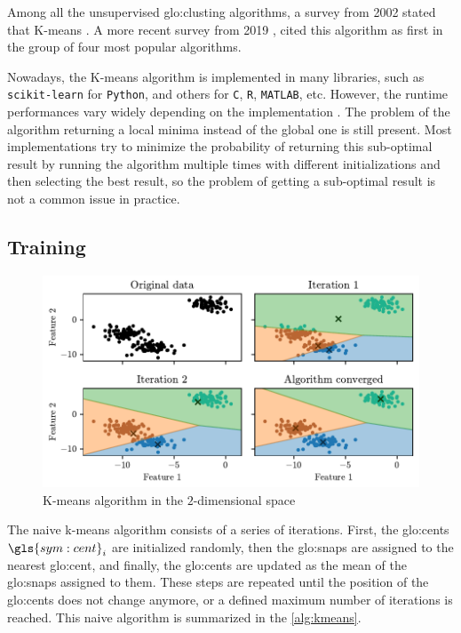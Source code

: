 Among all the unsupervised \gls{glo:clust}ing algorithms, a survey from 2002 \cite{berkhin2002survey} stated that K-means . A more recent survey from 2019 \cite{Abla2019survey}, cited this algorithm as first in the group of four most popular algorithms.

Nowadays, the K-means algorithm is implemented in many libraries, such as \texttt{scikit-learn} for \texttt{Python}, and others for \texttt{C}, \texttt{R}, \texttt{MATLAB}, etc. However, the runtime performances vary widely depending on the implementation \cite{Kmeans-performances-Kriegel2017}. The problem of the algorithm returning a local minima instead of the global one is still present. Most implementations try to minimize the probability of returning this sub-optimal result by running the algorithm multiple times with different initializations and then selecting the best result, so the problem of getting a sub-optimal result is not a common issue in practice.

\subsection{Training}

\begin{figure}[htbp]
  \centering
  \includegraphics[width=\textwidth]{images/Kmeans/Kmeans_vornoi.pdf}
  \caption{K-means algorithm in the $2$-dimensional space}
  \label{fig:kmeans_vornoi}
\end{figure}

 The naive k-means algorithm consists of a series of iterations. First, the {\gls{glo:cent}}s $\gls{sym:cent}_i$ are initialized randomly, then the {\gls{glo:snap}}s are assigned to the nearest {\gls{glo:cent}}, and finally, the {\gls{glo:cent}}s are updated as the mean of the {\gls{glo:snap}}s assigned to them. These steps are repeated until the position of the {\gls{glo:cent}}s does not change anymore, or a defined maximum number of iterations is reached. This naive algorithm is summarized in the \autoref{alg:kmeans}.

